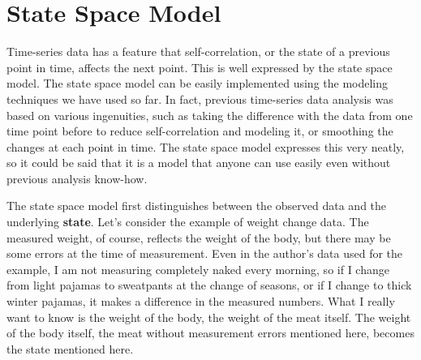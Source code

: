 \documentclass{ltjsbook}
\begin{document}
\section{State Space Model}
Time-series data has a feature that self-correlation, or the state of a previous point in time, affects the next point. This is well expressed by the state space model. The state space model can be easily implemented using the modeling techniques we have used so far. In fact, previous time-series data analysis was based on various ingenuities, such as taking the difference with the data from one time point before to reduce self-correlation and modeling it, or smoothing the changes at each point in time. The state space model expresses this very neatly, so it could be said that it is a model that anyone can use easily even without previous analysis know-how.

The state space model first distinguishes between the observed data and the underlying \textbf{state}.
Let's consider the example of weight change data. The measured weight, of course, reflects the weight of the body, but there may be some errors at the time of measurement. Even in the author's data used for the example, I am not measuring completely naked every morning, so if I change from light pajamas to sweatpants at the change of seasons, or if I change to thick winter pajamas, it makes a difference in the measured numbers. What I really want to know is the weight of the body, the weight of the meat itself. The weight of the body itself, the meat without measurement errors mentioned here, becomes the state mentioned here.
\end{document}
